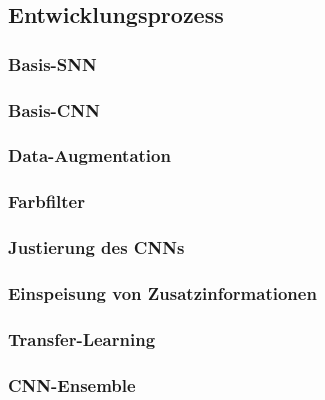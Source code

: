 \subsection{Entwicklungsprozess}\label{cha:met:dev}

\subsubsection{Basis-SNN}

\subsubsection{Basis-CNN}

\subsubsection{Data-Augmentation}

\subsubsection{Farbfilter}

\subsubsection{Justierung des CNNs}

\subsubsection{Einspeisung von Zusatzinformationen}

\subsubsection{Transfer-Learning}

\subsubsection{CNN-Ensemble}